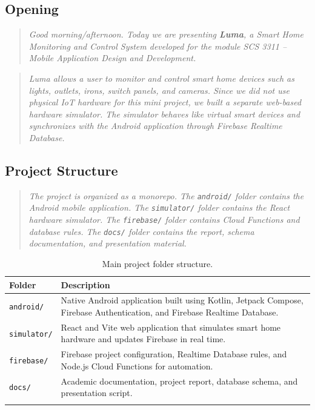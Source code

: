 \documentclass[11pt,a4paper]{article}
\begin{document}
\subsection{Opening}
\begin{quote}
\textit{Good morning/afternoon. Today we are presenting \textbf{Luma}, a Smart Home Monitoring and Control System developed for the module SCS 3311 -- Mobile Application Design and Development.}
\end{quote}

\begin{quote}
\textit{Luma allows a user to monitor and control smart home devices such as lights, outlets, irons, switch panels, and cameras. Since we did not use physical IoT hardware for this mini project, we built a separate web-based hardware simulator. The simulator behaves like virtual smart devices and synchronizes with the Android application through Firebase Realtime Database.}
\end{quote}

\subsection{Project Structure}
\begin{quote}
\textit{The project is organized as a monorepo. The \texttt{android/} folder contains the Android mobile application. The \texttt{simulator/} folder contains the React hardware simulator. The \texttt{firebase/} folder contains Cloud Functions and database rules. The \texttt{docs/} folder contains the report, schema documentation, and presentation material.}
\end{quote}

\begin{longtable}{@{}p{3.2cm}p{10.6cm}@{}}
\toprule
\textbf{Folder} & \textbf{Description} \\
\midrule
\endhead
\texttt{android/} & Native Android application built using Kotlin, Jetpack Compose, Firebase Authentication, and Firebase Realtime Database. \\
\texttt{simulator/} & React and Vite web application that simulates smart home hardware and updates Firebase in real time. \\
\texttt{firebase/} & Firebase project configuration, Realtime Database rules, and Node.js Cloud Functions for automation. \\
\texttt{docs/} & Academic documentation, project report, database schema, and presentation script. \\
\bottomrule
\caption{Main project folder structure.}
\label{tab:main-folder-structure}
\end{longtable}
\end{document}
